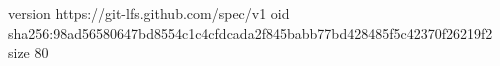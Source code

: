 version https://git-lfs.github.com/spec/v1
oid sha256:98ad56580647bd8554c1c4cfdcada2f845babb77bd428485f5c42370f26219f2
size 80
